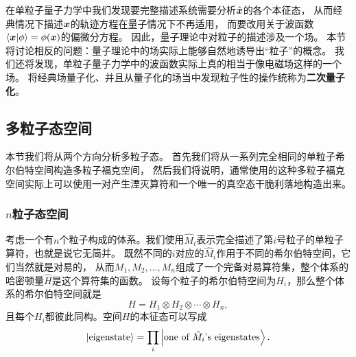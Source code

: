 \documentclass[hyperref, UTF8, a4paper]{ctexart}
\begin{document}
在单粒子量子力学中我们发现要完整描述系统需要分析$\hat{\vb*{x}}$的各个本征态，
从而经典情况下描述$\vb*{x}$的轨迹方程在量子情况下不再适用，
而要改用关于波函数$\braket{\vb*{x}}{\phi} = \phi(\vb*{x})$的偏微分方程。
因此，量子理论中对粒子的描述涉及一个场。
本节将讨论相反的问题：量子理论中的场实际上能够自然地诱导出“粒子”的概念。
我们还将发现，单粒子量子力学中的波函数实际上真的相当于像电磁场这样的一个场。
将经典场量子化、并且从量子化的场当中发现粒子性的操作统称为\textbf{二次量子化}。

\subsection{多粒子态空间}\label{sec:many-body-state}

本节我们将从两个方向分析多粒子态。
首先我们将从一系列完全相同的单粒子希尔伯特空间构造多粒子福克空间，
然后我们将说明，通常使用的这种多粒子福克空间实际上可以使用一对产生湮灭算符和一个唯一的真空态干脆利落地构造出来。

\subsubsection{$n$粒子态空间}\label{sec:n-particle-space}

考虑一个有$n$个粒子构成的体系。我们使用$\hat{M}_i$表示完全描述了第$i$号粒子的单粒子算符，也就是说它无简并。
既然不同的$i$对应的$\hat{M}_i$作用于不同的希尔伯特空间，它们当然就是对易的，
从而$M_1, M_2, \ldots, M_n$组成了一个完备对易算符集，整个体系的哈密顿量$\hat{H}$是这个算符集的函数。
设每个粒子的希尔伯特空间为$H_i$，那么整个体系的希尔伯特空间就是
\[
    H = H_1 \otimes H_2 \otimes \cdots \otimes H_n,
\]
且每个$H_i$都彼此同构。空间$H$的本征态可以写成
\[
    \ket{\text{eigenstate}} = \prod_i \ket{\text{one of $\hat{M}_i$'s eigenstates}}.
\]
\end{document}
